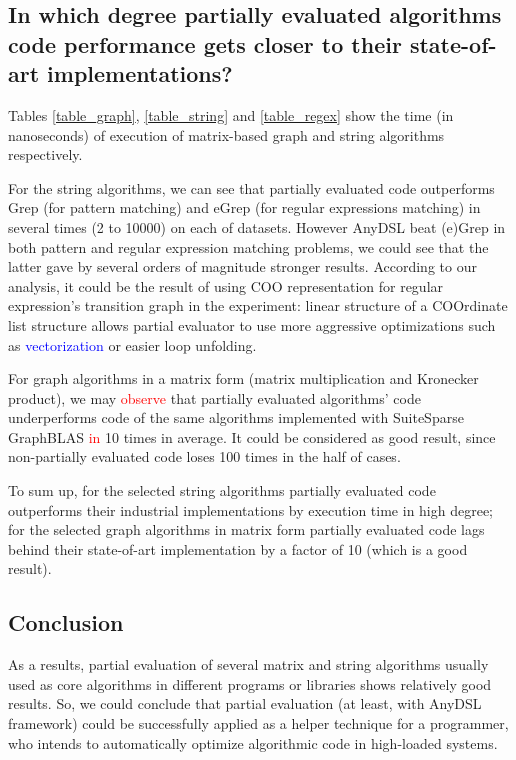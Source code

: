 \documentclass[conference]{IEEEtran}
\begin{document}
\begin{figure}
	\centering
\end{figure}

\subsection{In which degree partially evaluated algorithms code performance gets closer to their state-of-art implementations?}

Tables \ref{table_graph}, \ref{table_string} and \ref{table_regex} show the time (in nanoseconds) of execution of matrix-based graph and string algorithms respectively. 

For the string algorithms, we can see that partially evaluated code outperforms Grep (for pattern matching) and eGrep (for regular expressions matching) in several times (2 to 10000) on each of datasets. However AnyDSL beat (e)Grep in both pattern and regular expression matching problems, we could see that the latter gave by several orders of magnitude stronger results. According to our analysis, it could be the result of using COO representation for regular expression's transition graph in the experiment: linear structure of a COOrdinate list structure allows partial evaluator to use more aggressive optimizations such as \textcolor{blue}{vectorization} or easier loop unfolding.

For graph algorithms in a matrix form (matrix multiplication and Kronecker product), we may \textcolor{red}{observe} that partially evaluated algorithms' code underperforms code of the same algorithms implemented with SuiteSparse GraphBLAS \textcolor{red}{in} 10 times in average. It could be considered as good result, since non-partially evaluated code loses 100 times in the half of cases.

To sum up, for the selected string algorithms partially evaluated code outperforms their industrial implementations by execution time in high degree; for the selected graph algorithms in matrix form partially evaluated code lags behind their state-of-art implementation by a factor of 10 (which is a good result).

\subsection{Conclusion}
As a results, partial evaluation of several matrix and string algorithms usually used as core algorithms in different programs or libraries shows relatively good results. So, we could conclude that partial evaluation (at least, with AnyDSL framework) could be successfully applied as a helper technique for a programmer, who intends to automatically optimize algorithmic code in high-loaded systems.
\end{document}
